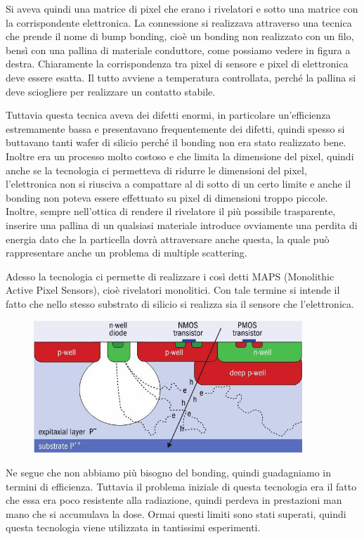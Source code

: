 Si aveva quindi una matrice di pixel che erano i rivelatori e sotto una matrice con la corrispondente elettronica. La connessione si realizzava attraverso una tecnica che prende il nome di bump bonding, cioè un bonding non realizzato con un filo, bensì con una pallina di materiale conduttore, come possiamo vedere in figura a destra. Chiaramente la corrispondenza tra pixel di sensore e pixel di elettronica deve essere esatta. Il tutto avviene a temperatura controllata, perché la pallina si deve sciogliere per realizzare un contatto stabile.

Tuttavia questa tecnica aveva dei difetti enormi, in particolare un'efficienza estremamente bassa e presentavano frequentemente dei difetti, quindi spesso si buttavano tanti wafer di silicio perché il bonding non era stato realizzato bene. Inoltre era un processo molto costoso e che limita la dimensione del pixel, quindi anche se la tecnologia ci permetteva di ridurre le dimensioni del pixel, l'elettronica non si riusciva a compattare al di sotto di un certo limite e anche il bonding non poteva essere effettuato su pixel di dimensioni troppo piccole. Inoltre, sempre nell'ottica di rendere il rivelatore il più possibile trasparente, inserire una pallina di un qualsiasi materiale introduce ovviamente una perdita di energia dato che la particella dovrà attraversare anche questa, la quale può rappresentare anche un problema di multiple scattering. 

Adesso la tecnologia ci permette di realizzare i così detti MAPS (Monolithic Active Pixel Sensors), cioè rivelatori monolitici. Con tale termine si intende il fatto che nello stesso substrato di silicio si realizza sia il sensore che l'elettronica.
\begin{figure}[H]
   \centering
   \includegraphics[width=0.9\textwidth]{immagini/rivelatore_monolitico.png}
\end{figure}
Ne segue che non abbiamo più bisogno del bonding, quindi guadagniamo in termini di efficienza. Tuttavia il problema iniziale di questa tecnologia era il fatto che essa era poco resistente alla radiazione, quindi perdeva in prestazioni man mano che si accumulava la dose. Ormai questi limiti sono stati superati, quindi questa tecnologia viene utilizzata in tantissimi esperimenti.